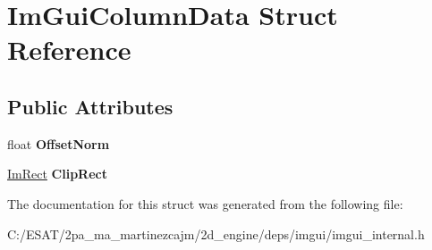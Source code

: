 \hypertarget{struct_im_gui_column_data}{}\section{Im\+Gui\+Column\+Data Struct Reference}
\label{struct_im_gui_column_data}
\subsection*{Public Attributes}
\begin{DoxyCompactItemize}
\item 
\mbox{\label{struct_im_gui_column_data_a9678a00f55c9fa44ed35ec14ea9b697b}} 
float {\bfseries Offset\+Norm}
\item 
\mbox{\label{struct_im_gui_column_data_aeccf8bbbd380fdd9d3350b5aac95ad34}} 
\hyperlink{struct_im_rect}{Im\+Rect} {\bfseries Clip\+Rect}
\end{DoxyCompactItemize}


The documentation for this struct was generated from the following file\+:\begin{DoxyCompactItemize}
\item 
C\+:/\+E\+S\+A\+T/2pa\+\_\+ma\+\_\+martinezcajm/2d\+\_\+engine/deps/imgui/imgui\+\_\+internal.\+h\end{DoxyCompactItemize}
